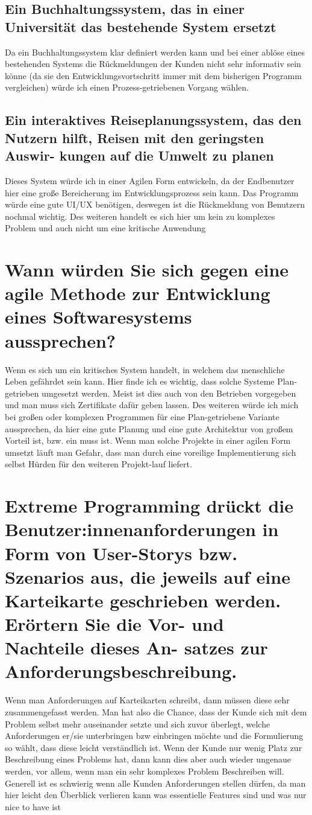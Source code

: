 \documentclass[12pt]{article}
\begin{document}
\subsection{Ein Buchhaltungssystem, das in einer Universität das bestehende System ersetzt}
Da ein Buchhaltungssystem klar definiert werden kann und bei einer ablöse eines bestehenden Systems die Rückmeldungen der Kunden nicht sehr informativ sein könne (da sie den Entwicklungsvortschritt immer mit dem bisherigen Programm vergleichen) würde ich einen Prozess-getriebenen Vorgang wählen.
\subsection{Ein interaktives Reiseplanungssystem, das den Nutzern hilft, Reisen mit den geringsten Auswir-
kungen auf die Umwelt zu planen}
Dieses System würde ich in einer Agilen Form entwickeln, da der Endbenutzer hier eine große Bereicherung im Entwicklungsprozess sein kann. Das Programm würde eine gute UI/UX benötigen, deswegen ist die Rückmeldung von Benutzern nochmal wichtig. Des weiteren handelt es sich hier um kein zu komplexes Problem und auch nicht um eine kritische Anwendung
\section{Wann würden Sie sich gegen eine agile Methode zur Entwicklung eines Softwaresystems aussprechen?}
Wenn es sich um ein kritisches System handelt, in welchem das menschliche Leben gefährdet sein kann. Hier finde ich es wichtig, dass solche Systeme Plan-getrieben umgesetzt werden. Meist ist dies auch von den Betrieben vorgegeben und man muss sich Zertifikate dafür geben lassen. Des weiteren würde ich mich bei großen oder komplexen Programmen für eine Plan-getriebene Variante aussprechen, da hier eine gute Planung und eine gute Architektur von großem Vorteil ist, bzw. ein muss ist. Wenn man solche Projekte in einer agilen Form umsetzt läuft man Gefahr, dass man durch eine voreilige Implementierung sich selbst Hürden für den weiteren Projekt-lauf liefert.
\pagebreak
\section{Extreme Programming drückt die Benutzer:innenanforderungen in Form von User-Storys bzw. Szenarios
aus, die jeweils auf eine Karteikarte geschrieben werden. Erörtern Sie die Vor- und Nachteile dieses An-
satzes zur Anforderungsbeschreibung.}
Wenn man Anforderungen auf Karteikarten schreibt, dann müssen diese sehr zusammengefasst werden. Man hat also die Chance, dass der Kunde sich mit dem Problem selbst mehr auseinander setzte und sich zuvor überlegt, welche Anforderungen er/sie unterbringen bzw einbringen möchte und die Formulierung so wählt, dass diese leicht verständlich ist. Wenn der Kunde nur wenig Platz zur Beschreibung eines Problems hat, dann kann dies aber auch wieder ungenaue werden, vor allem, wenn man ein sehr komplexes Problem Beschreiben will. Generell ist es schwierig wenn alle Kunden Anforderungen stellen dürfen, da man hier leicht den Überblick verlieren kann was essentielle Features sind und was nur nice to have ist
\end{document}
